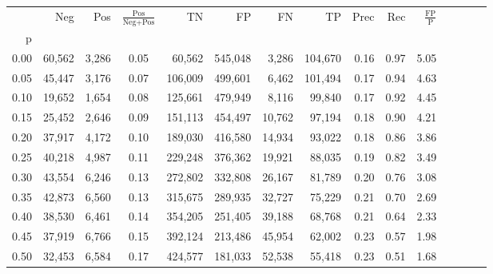 \begin{tabular}{rrrcrrrrrrrrrrr}
\toprule
{} &     Neg &     Pos & $\frac{\text{Pos}}{\text{Neg}+\text{Pos}}$ &       TN &       FP &       FN &       TP &  Prec &   Rec & $\frac{\text{FP}}{\text{P}}$ \\
p    &         &         &                                            &          &          &          &          &       &       &                              \\
\midrule
0.00 &  60,562 &   3,286 &                                       0.05 &   60,562 &  545,048 &    3,286 &  104,670 &  0.16 &  0.97 &                         5.05 \\
0.05 &  45,447 &   3,176 &                                       0.07 &  106,009 &  499,601 &    6,462 &  101,494 &  0.17 &  0.94 &                         4.63 \\
0.10 &  19,652 &   1,654 &                                       0.08 &  125,661 &  479,949 &    8,116 &   99,840 &  0.17 &  0.92 &                         4.45 \\
0.15 &  25,452 &   2,646 &                                       0.09 &  151,113 &  454,497 &   10,762 &   97,194 &  0.18 &  0.90 &                         4.21 \\
0.20 &  37,917 &   4,172 &                                       0.10 &  189,030 &  416,580 &   14,934 &   93,022 &  0.18 &  0.86 &                         3.86 \\
0.25 &  40,218 &   4,987 &                                       0.11 &  229,248 &  376,362 &   19,921 &   88,035 &  0.19 &  0.82 &                         3.49 \\
0.30 &  43,554 &   6,246 &                                       0.13 &  272,802 &  332,808 &   26,167 &   81,789 &  0.20 &  0.76 &                         3.08 \\
0.35 &  42,873 &   6,560 &                                       0.13 &  315,675 &  289,935 &   32,727 &   75,229 &  0.21 &  0.70 &                         2.69 \\
0.40 &  38,530 &   6,461 &                                       0.14 &  354,205 &  251,405 &   39,188 &   68,768 &  0.21 &  0.64 &                         2.33 \\
0.45 &  37,919 &   6,766 &                                       0.15 &  392,124 &  213,486 &   45,954 &   62,002 &  0.23 &  0.57 &                         1.98 \\
0.50 &  32,453 &   6,584 &                                       0.17 &  424,577 &  181,033 &   52,538 &   55,418 &  0.23 &  0.51 &                         1.68 \\

\end{tabular}
